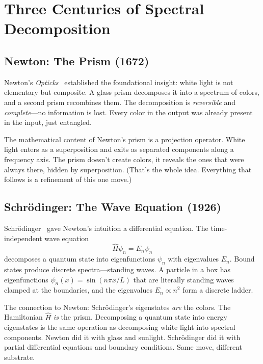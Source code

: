 \section{Three Centuries of Spectral Decomposition}


\subsection{Newton: The Prism (1672)}

Newton's \emph{Opticks}~\cite{newton} established the foundational insight: white light is not elementary but composite. A glass prism decomposes it into a spectrum of colors, and a second prism recombines them. The decomposition is \emph{reversible} and \emph{complete}---no information is lost. Every color in the output was already present in the input, just entangled.

The mathematical content of Newton's prism is a projection operator. White light enters as a superposition and exits as separated components along a frequency axis. The prism doesn't create colors, it reveals the ones that were always there, hidden by superposition. (That's the whole idea. Everything that follows is a refinement of this one move.)

\subsection{Schr\"odinger: The Wave Equation (1926)}

Schr\"odinger~\cite{schrodinger} gave Newton's intuition a differential equation. The time-independent wave equation
\begin{equation}\label{eq:schrodinger}
\hat{H}\psi_n = E_n \psi_n
\end{equation}
decomposes a quantum state into eigenfunctions $\psi_n$ with eigenvalues $E_n$. Bound states produce discrete spectra---standing waves. A particle in a box has eigenfunctions $\psi_n(x) = \sin(n\pi x / L)$ that are literally standing waves clamped at the boundaries, and the eigenvalues $E_n \propto n^2$ form a discrete ladder.

The connection to Newton: Schr\"odinger's eigenstates \emph{are} the colors. The Hamiltonian $\hat{H}$ \emph{is} the prism. Decomposing a quantum state into energy eigenstates is the same operation as decomposing white light into spectral components. Newton did it with glass and sunlight. Schr\"odinger did it with partial differential equations and boundary conditions. Same move, different substrate.


